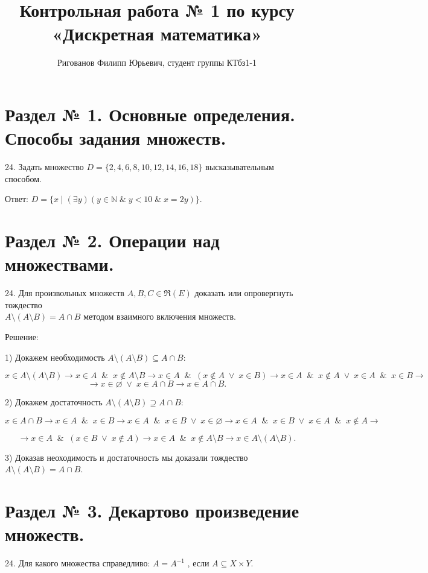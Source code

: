 \documentclass{article}
\title{Контрольная работа № 1 по курсу «Дискретная математика»}
\author{Ригованов Филипп Юрьевич, студент группы КТбз1-1}
\begin{document}
\date{}
\maketitle
\section*{Раздел № 1. Основные определения. Способы задания множеств.}
24. Задать множество $D = \{2, 4, 6, 8, 10, 12, 14, 16, 18\}$ высказывательным способом.

Ответ: $D = \{x \;| \; (\exists y)( y \in \mathbb{N} \;\&\; y < 10 \;\&\; x = 2y)\}$.
\section*{Раздел № 2. Операции над множествами.}
24. Для произвольных множеств $A , B , C  \in  \mathfrak{R}(E)$ доказать или опровергнуть тождество \\ $A \setminus (A \setminus B) = A \cap B$ методом взаимного включения множеств.

\begin{center}Решение:\end{center}

1) Докажем необходимость $A \setminus (A \setminus B) \subseteq A \cap B$:

$$x \in A \setminus (A \setminus B) \rightarrow x \in A \;\;\&\;\; x \notin A \setminus B \rightarrow x \in A \;\;\&\;\; (x \notin A \;\vee\; x \in B) \rightarrow x \in A \;\;\&\;\; x \notin A \;\vee\; x \in A \;\;\&\;\; x \in B \rightarrow$$
$$ \rightarrow x \in \varnothing \;\vee\; x \in A\cap B \rightarrow x \in A\cap B.$$

2) Докажем достаточность $A \setminus (A \setminus B) \supseteq A \cap B$:

$$x \in A\cap B \rightarrow x \in A \;\;\&\;\; x \in B \rightarrow x \in A \;\;\&\;\; x \in B \;\vee\; x \in \varnothing \rightarrow x \in A \;\;\&\;\; x \in B \;\vee\; x \in A \;\;\&\;\; x \notin A \rightarrow$$

$$\rightarrow x \in A \;\;\&\;\; (x \in B \;\vee\; x \notin A) \rightarrow x \in A \;\;\&\;\; x \notin A \setminus B \rightarrow x \in A \setminus (A \setminus B).$$

3) Доказав неоходимость и достаточность мы доказали тождество $A \setminus (A \setminus B) = A \cap B$.

\section*{Раздел № 3. Декартово произведение множеств.}
24. Для какого множества справедливо: $A = A^{-1}$ , если $A \subseteq X \times  Y$.
\end{document}
